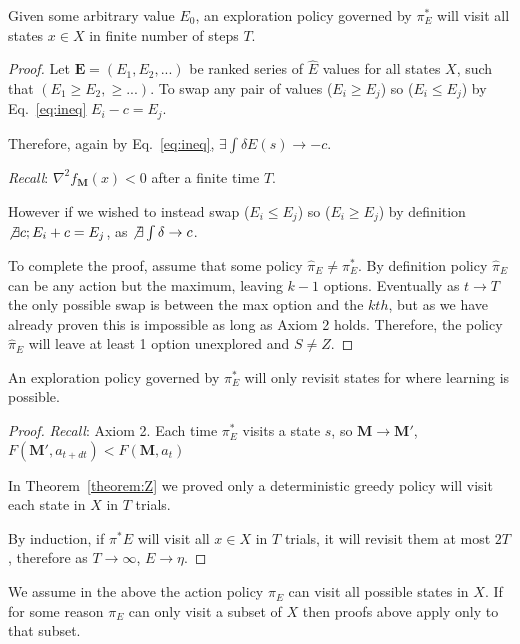 \begin{theorem} \label{theorem:Z} 
	Given some arbitrary value $E_0$, an exploration policy governed by $\pi^*_E$ will visit all states $x \in X$ in finite number of steps $T$.
\end{theorem}
\begin{proof}
	Let $\mathbf{E} = (E_1, E_2, ...)$ be ranked series of $\hat E$ values for all states $X$, such that $(E_1 \geq E_2, \geq ...)$. To swap any pair of values ($E_i \geq E_j$) so ($E_i \leq E_j$) by Eq.~\ref{eq:ineq} $E_i - c = E_j$. 
	
	Therefore, again by Eq.~\ref{eq:ineq}, $\exists \int \delta E(s) \rightarrow -c$. 
	
	\textit{Recall}: $\nabla^2 f_{\mathbf{M}}(x) < 0$ after a finite time $T$.
	
	However if we wished to instead swap ($E_i \leq E_j$) so ($E_i \geq E_j$) by definition $\not \exists c; E_i + c = E_j$, as $\not \exists \int \delta \rightarrow c$. 
	
	To complete the proof, assume that some policy $\hat \pi_E \neq \pi^*_E$. By definition policy $\hat \pi_E$ can be any action but the maximum, leaving $k-1$ options. Eventually as $t \rightarrow T$ the only possible swap is between the max option and the $kth$, but as we have already proven this is impossible as long as Axiom 2 holds. Therefore, the policy $\hat \pi_E$ will leave at least 1 option unexplored and $S \neq Z$. 
\end{proof}
\begin{theorem} \label{theorem:convergence} 
	An exploration policy governed by $\pi^*_E$ will only revisit states for where learning is possible.
\end{theorem}
\begin{proof}
	\textit{Recall}: Axiom 2. Each time $\pi^*_E$ visits a state $s$, so $\mathbf{M} \rightarrow \mathbf{M}'$, $F(\mathbf{M}', a_{t+dt}) < F(\mathbf{M}, a_t)$
	
	In Theorem~\ref{theorem:Z} we proved only a deterministic greedy policy will visit each state in $X$ in $T$ trials.
	
	By induction, if $\pi^*E$ will visit all $x \in X$ in $T$ trials, it will revisit them at most $2T$, therefore as $T \rightarrow \infty$, $E \rightarrow \eta$. 
\end{proof}

We assume in the above the action policy $\pi_E$ can visit all possible states in $X$. If for some reason $\pi_E$ can only visit a subset of $X$ then proofs above apply only to that subset. 

